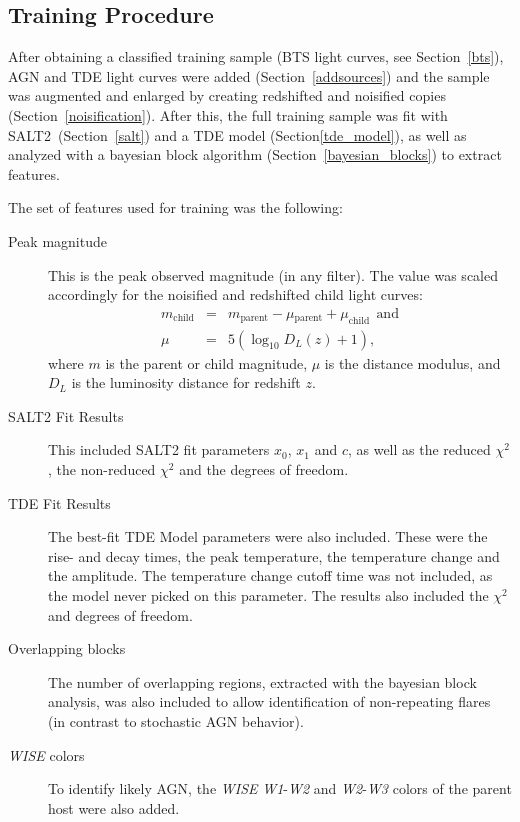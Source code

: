 \subsection{Training Procedure}
After obtaining a classified training sample (BTS light curves, see Section~\ref{bts}), AGN and TDE light curves were added (Section~\ref{addsources}) and the sample was augmented and enlarged by creating redshifted and noisified copies (Section~\ref{noisification}). After this, the full training sample was fit with SALT2~(Section~\ref{salt}) and a TDE model (Section\ref{tde_model}), as well as analyzed with a bayesian block algorithm (Section~\ref{bayesian_blocks}) to extract features.

The set of features used for training was the following:

\begin{description}
  \item[Peak magnitude] This is the peak observed magnitude (in any filter). The value was scaled accordingly for the noisified and redshifted child light curves:
        \begin{subequations}
          \begin{eqnarray}
            m_\text{child} &=& m_\text{parent} - \mu­_\text{parent} + \mu_\text{child}~~\text{and}\\
            \mu &=& 5(\log_{10}D_L(z)+1),
          \end{eqnarray}
        \end{subequations}
        where $m$ is the parent or child magnitude, $\mu$ is the distance modulus, and $D_L$ is the luminosity distance for redshift $z$.
  \item[SALT2 Fit Results] This included SALT2 fit parameters $x_0$, $x_1$ and $c$, as well as the reduced $\chi^2$, the non-reduced $\chi^2$ and the degrees of freedom.
  \item[TDE Fit Results] The best-fit TDE Model parameters were also included. These were the rise- and decay times, the peak temperature, the temperature change and the amplitude. The temperature change cutoff time was not included, as the model never picked on this parameter. The results also included the $\chi^2$ and degrees of freedom.
  \item[Overlapping blocks] The number of overlapping regions, extracted with the bayesian block analysis, was also included to allow identification of non-repeating flares (in contrast to stochastic AGN behavior).
  \item[\textit{WISE} colors] To identify likely AGN, the \textit{WISE} \textit{W1}-\textit{W2} and \textit{W2}-\textit{W3} colors of the parent host were also added.

\end{description}
